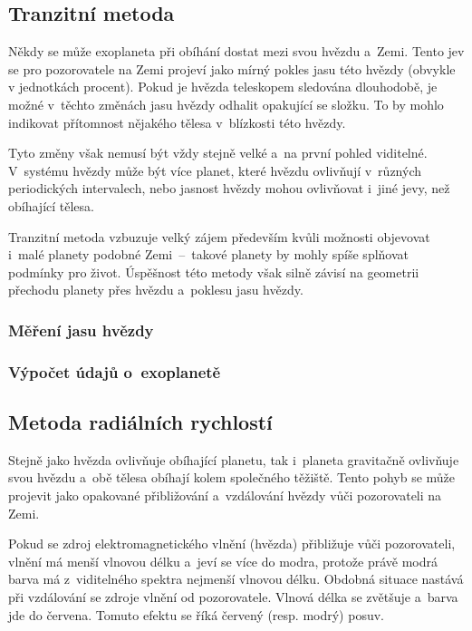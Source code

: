 \documentclass[a4paper,12pt]{article}
\begin{document}

\dataplot

\clearpage
\subsection{Tranzitní metoda}

Někdy se může exoplaneta při obíhání dostat mezi svou hvězdu a~Zemi. Tento jev se pro pozorovatele na Zemi projeví jako mírný pokles jasu této hvězdy (obvykle v jednotkách procent). Pokud je hvězda teleskopem sledována dlouhodobě, je možné v~těchto změnách jasu hvězdy odhalit opakující se složku. To by mohlo indikovat přítomnost nějakého tělesa v~blízkosti této hvězdy.

Tyto změny však nemusí být vždy stejně velké a~na první pohled viditelné. V~systému hvězdy může být více planet, které hvězdu ovlivňují v~různých periodických intervalech, nebo jasnost hvězdy mohou ovlivňovat i~jiné jevy, než obíhající tělesa.


\drawgimp

Tranzitní metoda vzbuzuje velký zájem především kvůli možnosti objevovat i~malé planety podobné Zemi~--~takové planety by mohly spíše splňovat podmínky pro život. Úspěšnost této metody však silně závisí na geometrii přechodu planety přes hvězdu a~poklesu jasu hvězdy.

\subsubsection{Měření jasu hvězdy}
\subsubsection{Výpočet údajů o~exoplanetě}

\clearpage
\subsection{Metoda radiálních rychlostí}

Stejně jako hvězda ovlivňuje obíhající planetu, tak i~planeta gravitačně ovlivňuje svou hvězdu a~obě tělesa obíhají kolem společného těžiště. Tento pohyb se může projevit jako opakované přibližování a~vzdálování hvězdy vůči pozorovateli na Zemi.~\cite{methods}

Pokud se zdroj elektromagnetického vlnění (hvězda) přibližuje vůči pozorovateli, vlnění má menší vlnovou délku a~jeví se více do modra, protože právě modrá barva má z~viditelného spektra nejmenší vlnovou délku. Obdobná situace nastává při vzdálování se zdroje vlnění od pozorovatele. Vlnová délka se zvětšuje a~barva jde do červena. Tomuto efektu se říká červený (resp. modrý) posuv.~\cite{methods}
\end{document}
